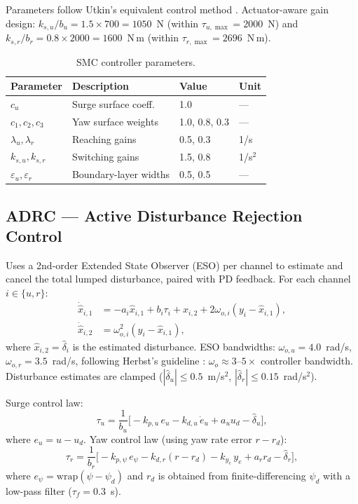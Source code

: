 \documentclass[review]{cas-dc}
\begin{document}
\begin{appendices}
Parameters follow Utkin's equivalent control method \citep{Utkin2009}. Actuator-aware gain design: $k_{s,u}/b_u = 1.5 \times 700 = 1050$~N (within $\tau_{u,\max} = 2000$~N) and $k_{s,r}/b_r = 0.8 \times 2000 = 1600$~N\,m (within $\tau_{r,\max} = 2696$~N\,m).

\begin{table}[h]
\centering
\caption{SMC controller parameters.}
\label{tab:smc_params}
\begin{tabular}{llll}
\toprule
Parameter & Description & Value & Unit \\
\midrule
$c_u$ & Surge surface coeff. & 1.0 & --- \\
$c_1, c_2, c_3$ & Yaw surface weights & 1.0, 0.8, 0.3 & --- \\
$\lambda_u, \lambda_r$ & Reaching gains & 0.5, 0.3 & 1/s \\
$k_{s,u}, k_{s,r}$ & Switching gains & 1.5, 0.8 & 1/s$^2$ \\
$\varepsilon_u, \varepsilon_r$ & Boundary-layer widths & 0.5, 0.5 & --- \\
\bottomrule
\end{tabular}
\end{table}


\subsection{ADRC --- Active Disturbance Rejection Control}
\label{sec:app_adrc}

Uses a 2nd-order Extended State Observer (ESO) per channel to estimate and cancel the total lumped disturbance, paired with PD feedback. For each channel $i \in \{u, r\}$:
\begin{align}
\dot{\hat{x}}_{i,1} &= -a_i\hat{x}_{i,1} + b_i\tau_i + \hat{x}_{i,2} + 2\omega_{o,i}(y_i - \hat{x}_{i,1}), \label{eq:eso1}\\
\dot{\hat{x}}_{i,2} &= \omega_{o,i}^2(y_i - \hat{x}_{i,1}), \label{eq:eso2}
\end{align}
where $\hat{x}_{i,2} = \hat{\delta}_i$ is the estimated disturbance. ESO bandwidths: $\omega_{o,u} = 4.0$~rad/s, $\omega_{o,r} = 3.5$~rad/s, following Herbst's guideline \citep{Herbst2013}: $\omega_o \approx 3$--$5\times$ controller bandwidth. Disturbance estimates are clamped ($|\hat{\delta}_u| \leq 0.5$~m/s$^2$, $|\hat{\delta}_r| \leq 0.15$~rad/s$^2$).

Surge control law:
\begin{equation}
\tau_u = \frac{1}{b_u}\Big[-k_{p,u}\,e_u - k_{d,u}\,\dot{e}_u + a_u u_d - \hat{\delta}_u\Big],
\label{eq:adrc_surge}
\end{equation}
where $e_u = u - u_d$. Yaw control law (using yaw rate error $r - r_d$):
\begin{equation}
\tau_r = \frac{1}{b_r}\Big[-k_{p,\psi}\,e_\psi - k_{d,r}(r - r_d) - k_{y_e}\,y_e + a_r r_d - \hat{\delta}_r\Big],
\label{eq:adrc_yaw}
\end{equation}
where $e_\psi = \mathrm{wrap}(\psi - \psi_d)$ and $r_d$ is obtained from finite-differencing $\psi_d$ with a low-pass filter ($\tau_f = 0.3$~s).


\end{appendices}
\end{document}

